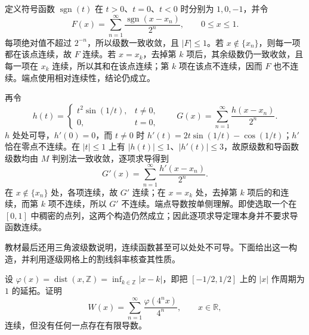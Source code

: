 \documentclass[UTF8,12pt,a4paper,fontset=fandol]{ctexbook}
\begin{document}
\begin{solve}
定义符号函数 $\operatorname{sgn}(t)$ 在 $t>0$、$t=0$、$t<0$ 时分别为 $1,0,-1$，并令
\[
    F(x)=\sum_{n=1}^\infty\frac{\operatorname{sgn}(x-x_n)}{2^n},
    \qquad 0\leq x\leq1.
\]
每项绝对值不超过 $2^{-n}$，所以级数一致收敛，且 $|F|\leq1$。若 $x\notin\{x_n\}$，则每一项都在该点连续，故 $F$ 连续。若 $x=x_k$，去掉第 $k$ 项后，其余级数仍一致收敛，且每一项在 $x_k$ 连续，所以其和在该点连续；第 $k$ 项在该点不连续，因而 $F$ 也不连续。端点使用相对连续性，结论仍成立。

再令
\[
    h(t)=\begin{cases}t^2\sin(1/t),&t\neq0,\\0,&t=0,\end{cases}
    \qquad
    G(x)=\sum_{n=1}^\infty\frac{h(x-x_n)}{2^n}.
\]
$h$ 处处可导，$h'(0)=0$，而 $t\neq0$ 时 $h'(t)=2t\sin(1/t)-\cos(1/t)$；$h'$ 恰在零点不连续。在 $|t|\leq1$ 上有 $|h(t)|\leq1$、$|h'(t)|\leq3$，故原级数和导函数级数均由 $M$ 判别法一致收敛，逐项求导得到
\[
    G'(x)=\sum_{n=1}^\infty\frac{h'(x-x_n)}{2^n}.
\]
在 $x\notin\{x_n\}$ 处，各项连续，故 $G'$ 连续；在 $x=x_k$ 处，去掉第 $k$ 项后的和连续，而第 $k$ 项不连续，所以 $G'$ 不连续。端点导数按单侧理解。即使选取一个在 $[0,1]$ 中稠密的点列，这两个构造仍然成立；因此逐项求导定理本身并不要求导函数连续。
\end{solve}

教材最后还用三角波级数说明，连续函数甚至可以处处不可导。下面给出这一构造，并利用逐级网格上的割线斜率核查其性质。

\begin{example}
\label{ex:continuous-nowhere-differentiable-triangular-series}
设 $\varphi(x)=\operatorname{dist}(x,\mathbb Z)=\inf_{k\in\mathbb Z}|x-k|$，即把 $[-1/2,1/2]$ 上的 $|x|$ 作周期为 $1$ 的延拓。证明
\[
    W(x)=\sum_{n=1}^\infty\frac{\varphi(4^nx)}{4^n},
    \qquad x\in\mathbb R,
\]
连续，但没有任何一点存在有限导数。
\end{example}
\end{document}
